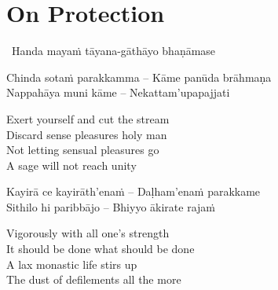 \suttaRef{[Thag 16.10]}




\section{On Protection}
\label{protection}

\begin{leader}
  \anglebracketleft\ \hspace{-0.5mm}Handa mayaṁ tāyana-gāthāyo bhaṇāmase \hspace{-0.5mm}\anglebracketright\
\end{leader}

\begin{verses}
  Chinda sotaṁ parakkamma – Kāme panūda brāhmaṇa\\
  Nappahāya muni kāme – Nekattam'upapajjati
\end{verses}

\begin{english-verses}
  Exert yourself and cut the stream\\
  Discard sense pleasures holy man\\
  Not letting sensual pleasures go\\
  A sage will not reach unity\makeatletter\hyperlink{endnote40-appendix}\makeatother
\end{english-verses}

\begin{verses}
  Kayirā ce kayirāth'enaṁ – Daḷham'enaṁ parakkame\\
  Sithilo hi paribbājo – Bhiyyo ākirate rajaṁ
\end{verses}

\begin{english-verses}
  Vigorously with all one's strength\\
  It should be done what should be done\\
  A lax monastic life stirs up\\
  The dust of defilements all the more\ifdigitalversion\makeatletter\hyperlink{endnote41-appendix}\makeatother\fi
\end{english-verses}

